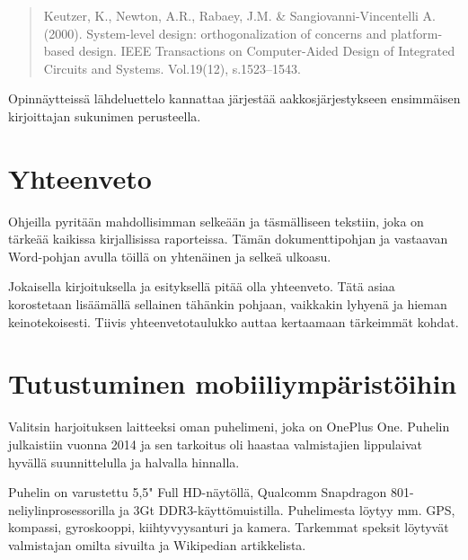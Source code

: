 \documentclass[globalnumbering,centeredcaptions,draftfooter]{tutthesis/tutthesis} %
\newif\ifnameyear
\begin{document}
\begin{quotation}
Keutzer, K., Newton, A.R., Rabaey, J.M. \& Sangiovanni-Vincentelli A. (2000). System-level design: orthogonalization of concerns and platform-based design. IEEE Transactions on Computer-Aided Design of Integrated Circuits and Systems. Vol.19(12), s.1523--1543.
\end{quotation}

Opinnäytteissä lähdeluettelo kannattaa järjestää aakkosjärjestykseen ensimmäisen kirjoittajan sukunimen perusteella.



\chapter{Yhteenveto}
\label{ch:yhteenveto}

Ohjeilla pyritään mahdollisimman selkeään ja täsmälliseen tekstiin, joka on tärkeää kaikissa kirjallisissa raporteissa.
Tämän dokumenttipohjan ja vastaavan Word-pohjan avulla töillä on yhtenäinen ja selkeä ulkoasu.

Jokaisella kirjoituksella ja esityksellä pitää olla yhteenveto.
Tätä asiaa korostetaan lisäämällä sellainen tähänkin pohjaan, vaikkakin lyhyenä ja hieman keinotekoisesti.
Tiivis yhteenvetotaulukko auttaa kertaamaan tärkeimmät kohdat.



\addto\extrasenglish{\btxifchangecaseoff} %

\ifnameyear
  
\else
  
\fi





\appendix

\chapter{Tutustuminen mobiiliympäristöihin}
\label{ch:harjoitus1}

Valitsin harjoituksen laitteeksi oman puhelimeni, joka on OnePlus One. Puhelin julkaistiin vuonna 2014 ja sen tarkoitus oli haastaa valmistajien lippulaivat hyvällä suunnittelulla ja halvalla hinnalla.

Puhelin on varustettu 5,5" Full HD-näytöllä, Qualcomm Snapdragon 801-neliylinprosessorilla ja 3Gt DDR3-käyttömuistilla. Puhelimesta löytyy mm. GPS, kompassi, gyroskooppi, kiihtyvyysanturi ja kamera. Tarkemmat speksit löytyvät valmistajan omilta sivuilta ja Wikipedian artikkelista.
\end{document}
